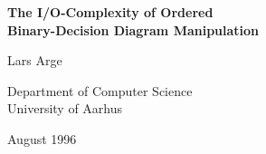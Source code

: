 \documentclass[english, aspectratio=169]{beamer}
\begin{document}
\begin{frame}
  \begin{center}
    {\Large\bf The I/O-Complexity of Ordered\\Binary-Decision Diagram Manipulation}

    Lars Arge

    {\footnotesize Department of Computer Science\\University of Aarhus}

    {\footnotesize August 1996}
  \end{center}
\end{frame}

%
%
%
\end{document}
